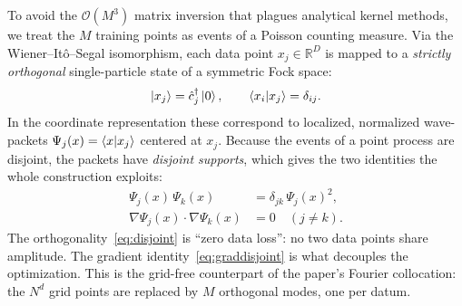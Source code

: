 \documentclass[11pt, a4paper]{article}
\newcommand{\Rset}{\mathbb{R}}
\begin{document}
To avoid the $\mathcal{O}(M^3)$ matrix inversion that plagues analytical kernel
methods, we treat the $M$ training points as events of a Poisson counting
measure. Via the Wiener--It\^o--Segal isomorphism, each data point
$x_j\in\Rset^D$ is mapped to a \emph{strictly orthogonal} single-particle
state of a symmetric Fock space:
\begin{equation}
  \ket{x_j}=\hat c_j^\dagger\ket{0},\qquad
  \braket{x_i | x_j}=\delta_{ij}.
\end{equation}
In the coordinate representation these correspond to localized, normalized
wave-packets $\Psi_j(x)=\braket{x | x_j}$ centered at $x_j$. Because the
events of a point process are disjoint, the packets have \emph{disjoint
supports}, which gives the two identities the whole construction exploits:
\begin{align}
  \Psi_j(x)\,\Psi_k(x)&=\delta_{jk}\,\Psi_j(x)^2,
  \label{eq:disjoint}\\
  \nabla\Psi_j(x)\cdot\nabla\Psi_k(x)&=0\quad(j\neq k).
  \label{eq:graddisjoint}
\end{align}
The orthogonality~\eqref{eq:disjoint} is ``zero data loss'': no two data points
share amplitude. The gradient identity~\eqref{eq:graddisjoint} is what
decouples the optimization. This is the grid-free counterpart of the paper's
Fourier collocation: the $N^d$ grid points are replaced by $M$ orthogonal
modes, one per datum.
\end{document}

